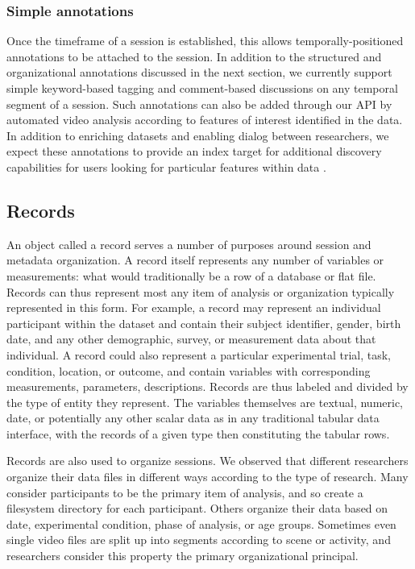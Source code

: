 \documentclass{sig-alternate}
\begin{document}
\subsubsection*{Simple annotations}

Once the timeframe of a session is established, this allows temporally-positioned annotations to be attached to the session.
In addition to the structured and organizational annotations discussed in the next section, we currently support simple keyword-based tagging and comment-based discussions on any temporal segment of a session.
Such annotations can also be added through our API by automated video analysis according to features of interest identified in the data.
In addition to enriching datasets and enabling dialog between researchers, we expect these annotations to provide an index target for additional discovery capabilities for users looking for particular features within data \cite{Lanagan_Smeaton_2012}.

\subsection{Records}

An object called a record serves a number of purposes around session and metadata organization.
A record itself represents any number of variables or measurements: what would traditionally be a row of a database or flat file.
Records can thus represent most any item of analysis or organization typically represented in this form.
For example, a record may represent an individual participant within the dataset and contain their subject identifier, gender, birth date, and any other demographic, survey, or measurement data about that individual.
A record could also represent a particular experimental trial, task, condition, location, or outcome, and contain variables with corresponding measurements, parameters, descriptions.
Records are thus labeled and divided by the type of entity they represent.
The variables themselves are textual, numeric, date, or potentially any other scalar data as in any traditional tabular data interface, with the records of a given type then constituting the tabular rows.

Records are also used to organize sessions.
We observed that different researchers organize their data files in different ways according to the type of research.
Many consider participants to be the primary item of analysis, and so create a filesystem directory for each participant.
Others organize their data based on date, experimental condition, phase of analysis, or age groups.
Sometimes even single video files are split up into segments according to scene or activity, and researchers consider this property the primary organizational principal.
\end{document}

